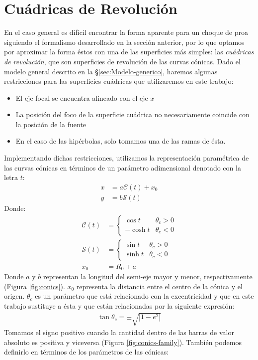 \section{Cuádricas de Revolución}
\label{sec:quadrics}
\newcommand\Sin{\ensuremath{\mathcal{S}}}
\newcommand\Cos{\ensuremath{\mathcal{C}}}
\newcommand\Cot{\ensuremath{\mathcal{T}}}


En el caso general es difícil encontrar la forma aparente para un choque de
proa siguiendo el formalismo desarrollado en la sección anterior, por lo que
optamos por aproximar la forma éstos con una de las superficies más simples:
las \textit{cuádricas de revolución}, que son superficies de revolución de
las curvas cónicas. Dado el modelo general descrito en la \S \ref{sec:Modelo-generico}, haremos algunas restricciones para las superficies
cuádricas que utilizaremos en este trabajo:
\begin{itemize}
  \item El eje focal se encuentra alineado con el eje $x$
  \item La posición del foco de la superficie cuádrica no necesariamente coincide
    con la posición de la fuente
  \item En el caso de las hipérbolas, solo tomamos una de las ramas de ésta.
\end{itemize}
Implementando dichas restricciones, utilizamos la representación paramétrica de
las curvas cónicas en términos de un parámetro adimensional denotado con la letra
$t$:
\begin{align}
  x &= a\Cos(t) + x_0\\
  y &= b\Sin(t) 
\end{align}
Donde:
\begin{align}
  \Cos(t) &=\left\lbrace
  \begin{array}{lr}
    \cos{t} & \theta_c > 0\\
    -\cosh{t} & \theta_c < 0        
  \end{array}\right. \\
  \Sin(t) &= \left\lbrace
  \begin{array}{lr}
    \sin{t} & \theta_c > 0\\
    \sinh{t}  & \theta_c < 0
  \end{array} \right. \\
  x_0 &= R_0 \mp a \label{eq:x0} 
\end{align}
Donde $a$ y $b$ representan la longitud del semi-eje mayor y menor, respectivamente (Figura \ref{fig:conics}).
$x_0$ representa la distancia entre el centro de la cónica y el origen. 
$\theta_c$ es un parámetro que está relacionado con la excentricidad y que en este
trabajo sustituye a ésta y que están relacionadas por la siguiente expresión:
\begin{align}
  \tan\theta_c = \pm\sqrt{\left|1-e^2\right|}
\end{align}
Tomamos el signo positivo cuando la cantidad dentro de las barras de valor absoluto es
positiva y viceversa (Figura \ref{fig:conics-family}). También podemos definirlo en
términos de los parámetros de las cónicas:

